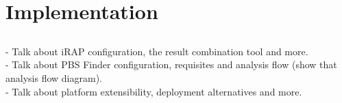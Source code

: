 \chapter{Implementation} \label{chap:implementation}

\section*{}

\begin{Notes}
- Talk about iRAP configuration, the result combination tool and more.\\
- Talk about PBS Finder configuration, requisites and analysis flow (show that analysis flow diagram).\\
- Talk about platform extensibility, deployment alternatives and more.\\
\end{Notes}

